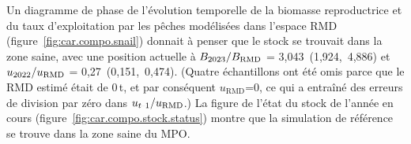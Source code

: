 \documentclass[11pt]{book}
\newcommand{\Bmsy}{B_\text{RMD}}
\newcommand{\umsy}{u_\text{RMD}}
\def\minus{%
  \setbox0=\hbox{-}%
  \vcenter{%
    \hrule width\wd0 height 0.05pt%
  }%
}
\begin{document}
Un diagramme de phase de l'\'{e}volution temporelle de la biomasse reproductrice et du taux d'exploitation par les p\^{e}ches mod\'{e}lis\'{e}es dans l'espace RMD (figure~\ref{fig:car.compo.snail}) donnait \`{a} penser que le stock se trouvait dans la zone saine, avec une position actuelle \`{a} $B_{\currYear}/\Bmsy$ = 3,043~(1,924,~4,886)
et $u_{\prevYear}/\umsy$ = 0,27~(0,151,~0,474).
(Quatre \'{e}chantillons ont \'{e}t\'{e} omis parce que le RMD estim\'{e} \'{e}tait de 0\,t, et par cons\'{e}quent $\umsy$=0, ce qui a entra\^{i}n\'{e} des erreurs de division par z\'{e}ro dans $u_{t\minus1}/\umsy$.)
La figure de l'\'{e}tat du stock de l'ann\'{e}e en cours (figure~\ref{fig:car.compo.stock.status}) montre que la simulation de r\'{e}f\'{e}rence se trouve dans la zone saine du MPO.


\newpage
{}
\end{document}
